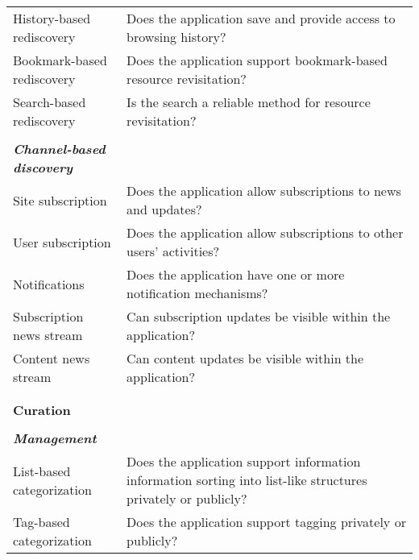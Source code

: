 \documentclass{casconpaper}
\begin{document}
{\begin{table*}[htbp]
\begin{tabular}{|p{0.28\linewidth}|p{0.72\linewidth}|}
History-based rediscovery    & Does the application save and provide access to browsing history?                                        \\
Bookmark-based rediscovery   & Does the application support bookmark-based resource revisitation?                                        \\
Search-based rediscovery     & Is the search a reliable method for resource revisitation?                             \\
&\\
\emph{\textbf{Channel-based discovery}}          &                                                                                                           \\
Site subscription            & Does the application allow subscriptions to news and updates?                                             \\
User subscription             & Does the application allow subscriptions to other users' activities?                                      \\
Notifications                & Does the application have one or more notification mechanisms?                                                      \\
Subscription news stream                  & Can subscription updates be visible within the application?  \\
Content news stream                  & Can content updates be visible within the application? \\
&\\
\hline     
&\\                                        
\textbf{\large{Curation}}                     &                                                                                                        \\     
&\\  
\emph{\textbf{Management}}                    &                                                                                                           \\
List-based categorization               & Does the application support information information sorting into list-like structures privately or publicly?                                                  \\
Tag-based categorization               & Does the application support tagging privately or publicly?                                                  \\

\end{tabular}
\end{table*}}
\end{document}
